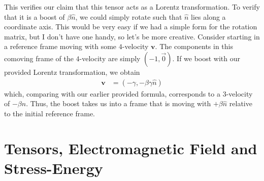 \documentclass[12pt]{report}
\newcommand{\bm}[1]{\boldsymbol{\mathbf{#1}}}
\begin{document}
\begin{description}
        This verifies our claim that this tensor acts as a Lorentz
        transformation. To verify that it is a boost of $\beta\hat{n}$, we could
        simply rotate such that $\hat{n}$ lies along a coordinate axis. This
        would be very easy if we had a simple form for the rotation matrix, but
        I don't have one handy, so let's be more creative. Consider starting in
        a reference frame moving with some $4$-velocity $\bm{v}$. The
        components in this comoving frame of the $4$-velocity are simply $(-1,
        \vec{0})$. If we boost with our provided Lorentz transformation, we
        obtain
        \begin{align}
            \bm{v} &= \left( -\gamma, -\beta\gamma \hat{n} \right)
        \end{align}
        which, comparing with our earlier provided formula, corresponds to a
        $3$-velocity of $-\beta \hat{n}$. Thus, the boost takes us into a frame
        that is moving with $+\beta \hat{n}$ relative to the initial reference
        frame.
\end{description}

\section{Tensors, Electromagnetic Field and Stress-Energy}
\end{document}
